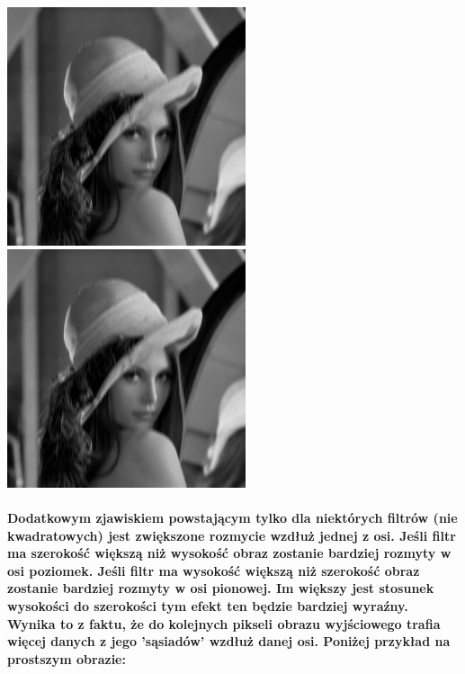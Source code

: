 \documentclass[a4paper,12pt,openany]{report}
\begin{document}
\begin{center}
\\
\\
\includegraphics[width=7cm]{resources/modified/lena/lena_blur_40x3.jpg}
\includegraphics[width=7cm]{resources/modified/lena/lena_blur_40x5.jpg}
\end{center}

\pagebreak
\paragraph{\indent Dodatkowym zjawiskiem powstającym tylko dla niektórych filtrów (nie kwadratowych) jest zwiększone rozmycie wzdłuż jednej z osi. Jeśli filtr ma szerokość większą niż wysokość obraz zostanie bardziej rozmyty w osi poziomek. Jeśli filtr ma wysokość większą niż szerokość obraz zostanie bardziej rozmyty w osi pionowej. Im większy jest stosunek wysokości do szerokości tym efekt ten będzie bardziej wyraźny. Wynika to z faktu, że do kolejnych pikseli obrazu wyjściowego trafia więcej danych z jego 'sąsiadów' wzdłuż danej osi. Poniżej przykład na prostszym obrazie:}
\end{document}
